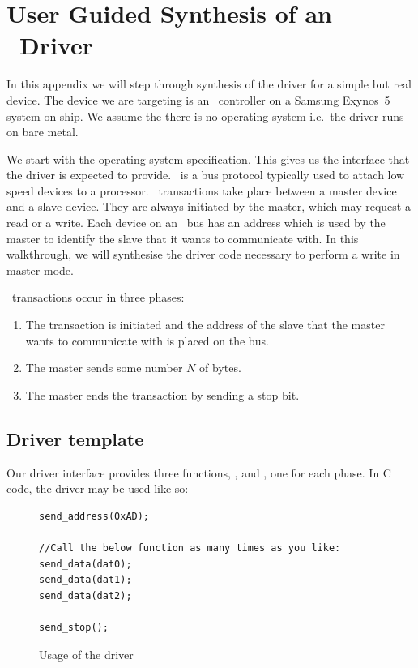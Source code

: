 \chapter{User Guided Synthesis of an \iic\ Driver}
\label{ch:worked_example}

In this appendix we will step through synthesis of the driver for a simple but real device. The device we are targeting is an \iic\ controller on a Samsung Exynos~5 system on ship. We assume the there is no operating system i.e.\ the driver runs on bare metal.

We start with the operating system specification. This gives us the interface that the driver is expected to provide. \iic\ is a bus protocol typically used to attach low speed devices to a processor. \iic\ transactions take place between a master device and a slave device. They are always initiated by the master, which may request a read or a write. Each device on an \iic\ bus has an address which is used by the master to identify the slave that it wants to communicate with. In this walkthrough, we will synthesise the driver code necessary to perform a write in master mode. 

\iic\ transactions occur in three phases:
\begin{enumerate}
    \item The transaction is initiated and the address of the slave that the master wants to communicate with is placed on the bus.
    \item The master sends some number $N$ of bytes.
    \item The master ends the transaction by sending a stop bit.
\end{enumerate}

\section{Driver template}

Our driver interface provides three functions, ,  and , one for each phase. In C code, the driver may be used like so:
\begin{figure}
\caption{Usage of the \iic driver}
\label{fig:iic_usage}
\begin{lstlisting}[frame=single]
send_address(0xAD);

//Call the below function as many times as you like:
send_data(dat0);
send_data(dat1);
send_data(dat2);

send_stop();
\end{lstlisting}
\end{figure}

